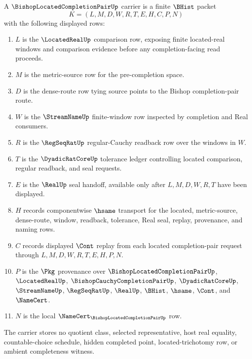 \begin{definition}
\label{def:bishop-located-completion-pair-carrier}
A $\BishopLocatedCompletionPairUp$ carrier is a finite $\BHist$ packet
$$
K=(L,M,D,W,R,T,E,H,C,P,N)
$$
with the following displayed rows:
\begin{enumerate}
\item $L$ is the $\LocatedRealUp$ comparison row, exposing finite located-real windows and comparison evidence before any completion-facing read proceeds.
\item $M$ is the metric-source row for the pre-completion space.
\item $D$ is the dense-route row tying source points to the Bishop completion-pair route.
\item $W$ is the $\StreamNameUp$ finite-window row inspected by completion and Real consumers.
\item $R$ is the $\RegSeqRatUp$ regular-Cauchy readback row over the windows in $W$.
\item $T$ is the $\DyadicRatCoreUp$ tolerance ledger controlling located comparison, regular readback, and seal requests.
\item $E$ is the $\RealUp$ seal handoff, available only after $L,M,D,W,R,T$ have been displayed.
\item $H$ records componentwise $\hsame$ transport for the located, metric-source, dense-route, window, readback, tolerance, Real seal, replay, provenance, and naming rows.
\item $C$ records displayed $\Cont$ replay from each located completion-pair request through $L,M,D,W,R,T,E,H,P,N$.
\item $P$ is the $\Pkg$ provenance over $\BishopLocatedCompletionPairUp$, $\LocatedRealUp$, $\BishopCauchyCompletionPairUp$, $\DyadicRatCoreUp$, $\StreamNameUp$, $\RegSeqRatUp$, $\RealUp$, $\BHist$, $\hsame$, $\Cont$, and $\NameCert$.
\item $N$ is the local $\NameCert_{\BishopLocatedCompletionPairUp}$ row.
\end{enumerate}
The carrier stores no quotient class, selected representative, host real equality, countable-choice schedule, hidden completed point, located-trichotomy row, or ambient completeness witness.
\end{definition}

